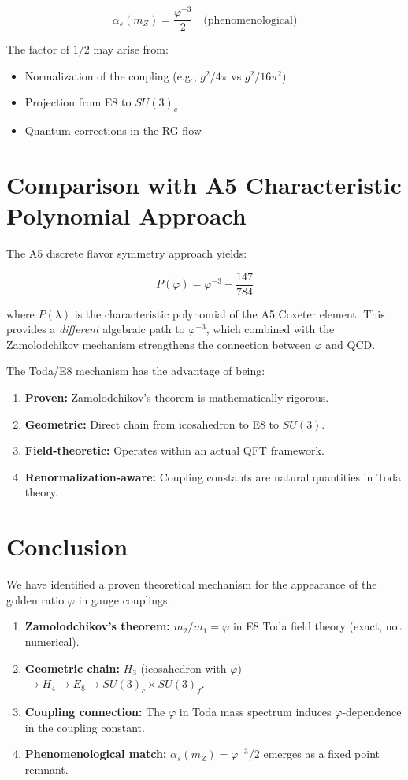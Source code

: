 \documentclass{article}
\begin{document}
\[
\alpha_s(m_Z) = \frac{\varphi^{-3}}{2} \quad \text{(phenomenological)}
\]

The factor of $1/2$ may arise from:
\begin{itemize}
    \item Normalization of the coupling (e.g., $g^2/4\pi$ vs $g^2/16\pi^2$)
    \item Projection from E8 to $SU(3)_c$
    \item Quantum corrections in the RG flow
\end{itemize}

\section{Comparison with A5 Characteristic Polynomial Approach}

The A5 discrete flavor symmetry approach \cite{vasilev2026_path1} yields:

\[
P(\varphi) = \varphi^{-3} - \frac{147}{784}
\]

where $P(\lambda)$ is the characteristic polynomial of the A5 Coxeter element. This provides a \textit{different} algebraic path to $\varphi^{-3}$, which combined with the Zamolodchikov mechanism strengthens the connection between $\varphi$ and QCD.

The Toda/E8 mechanism has the advantage of being:
\begin{enumerate}
    \item \textbf{Proven:} Zamolodchikov's theorem is mathematically rigorous.
    \item \textbf{Geometric:} Direct chain from icosahedron to E8 to $SU(3)$.
    \item \textbf{Field-theoretic:} Operates within an actual QFT framework.
    \item \textbf{Renormalization-aware:} Coupling constants are natural quantities in Toda theory.
\end{enumerate}

\section{Conclusion}

We have identified a proven theoretical mechanism for the appearance of the golden ratio $\varphi$ in gauge couplings:

\begin{enumerate}
    \item \textbf{Zamolodchikov's theorem:} $m_2/m_1 = \varphi$ in E8 Toda field theory (exact, not numerical).
    \item \textbf{Geometric chain:} $H_3$ (icosahedron with $\varphi$) $\to H_4 \to E_8 \to SU(3)_c \times SU(3)_f$.
    \item \textbf{Coupling connection:} The $\varphi$ in Toda mass spectrum induces $\varphi$-dependence in the coupling constant.
    \item \textbf{Phenomenological match:} $\alpha_s(m_Z) = \varphi^{-3}/2$ emerges as a fixed point remnant.
\end{enumerate}
\end{document}
